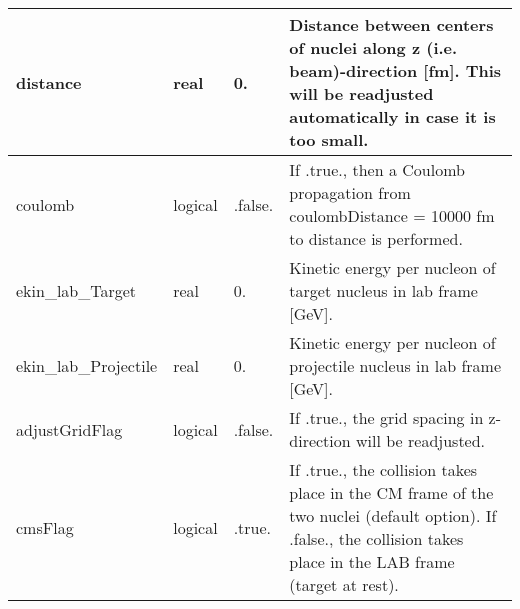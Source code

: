 \documentclass{article}
\begin{document}
\begin{longtable}{llll}
\midrule
distance & \begin{minipage}[t]{2cm}real\end{minipage} & \begin{minipage}[t]{2cm}0.\end{minipage} & \begin{minipage}[t]{12cm}Distance between centers of nuclei along z (i.e. beam)-direction [fm]. This will be readjusted automatically in case it is too small.\end{minipage}\\*
\midrule
coulomb & \begin{minipage}[t]{2cm}logical\end{minipage} & \begin{minipage}[t]{2cm}.false.\end{minipage} & \begin{minipage}[t]{12cm}If .true., then a Coulomb propagation from coulombDistance = 10000 fm to distance is performed.\end{minipage}\\*
\midrule
ekin\_lab\_Target & \begin{minipage}[t]{2cm}real\end{minipage} & \begin{minipage}[t]{2cm}0.\end{minipage} & \begin{minipage}[t]{12cm}Kinetic energy per nucleon of target nucleus in lab frame [GeV].\end{minipage}\\*
\midrule
ekin\_lab\_Projectile & \begin{minipage}[t]{2cm}real\end{minipage} & \begin{minipage}[t]{2cm}0.\end{minipage} & \begin{minipage}[t]{12cm}Kinetic energy per nucleon of projectile nucleus in lab frame [GeV].\end{minipage}\\*
\midrule
adjustGridFlag & \begin{minipage}[t]{2cm}logical\end{minipage} & \begin{minipage}[t]{2cm}.false.\end{minipage} & \begin{minipage}[t]{12cm}If .true., the grid spacing in z-direction will be readjusted.\end{minipage}\\*
\midrule
cmsFlag & \begin{minipage}[t]{2cm}logical\end{minipage} & \begin{minipage}[t]{2cm}.true.\end{minipage} & \begin{minipage}[t]{12cm}If .true.,  the collision takes place in the CM frame of the two nuclei (default option). If .false., the collision takes place in the LAB frame (target at rest).\end{minipage}\\*
\bottomrule
\end{longtable}
{ }
\end{document}
